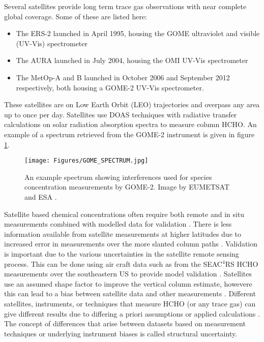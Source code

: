       Several satellites provide long term trace gas observations with near complete global coverage. 
      Some of these are listed here:
      \begin{itemize}
        \item  The ERS-2 launched in April 1995, housing the GOME ultraviolet and visible (UV-Vis) spectrometer
        \item The AURA launched in July 2004, housing the OMI UV-Vis spectrometer
        \item The MetOp-A and B launched in October 2006 and September 2012 respectively, both housing a GOME-2 UV-Vis spectrometer.
      \end{itemize}
      These satellites are on Low Earth Orbit (LEO) trajectories and overpass any area up to once per day.
      Satellites use DOAS techniques with radiative transfer calculations on solar radiation absorption spectra to measure column HCHO.
      An example of a spectrum retrieved from the GOME-2 instrument is given in figure \ref{LR:HCHO:Sat:fig_GOME_products}.
      
      \begin{figure}
        \texttt{[image: Figures/GOME\_SPECTRUM.jpg]}
        \caption{%
          An example spectrum showing interferences used for species concentration measurements by GOME-2. Image by EUMETSAT and ESA \parencite{GOME2Image}.
          }
        \label{LR:HCHO:Sat:fig_GOME_products}
      \end{figure}
      
      Satellite based chemical concentrations often require both remote and in situ measurements combined with modelled data for validation \parencite{Marais2014}.
      There is less information available from satellite measurements at higher latitudes due to increased error in measurements over the more slanted column paths \parencite{DeSmedt2015}.
      Validation is important due to the various uncertainties in the satellite remote sensing process.
      This can be done using air craft data such as from the SEAC$^4$RS HCHO measurements over the southeastern US to provide model validation \parencite[e.g.][]{Zhu2016}. 
      Satellites use an assumed shape factor to improve the vertical column estimate, howevere this can lead to a bias between satellite data and other measurements \parencite{Zhu2016}.
      Different satellites, instruments, or techniques that measure HCHO (or any trace gas) can give different results due to differing a priori assumptions or applied calculations \parencite{Lorente2017}.
      The concept of differences that arise between datasets based on measurement techniques or underlying instrument biases is called structural uncertainty.
      
